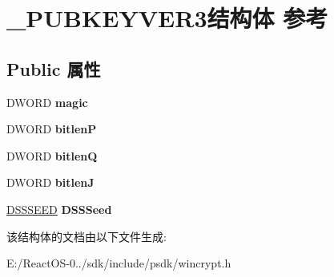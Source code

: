 \hypertarget{struct___p_u_b_k_e_y_v_e_r3}{}\section{\+\_\+\+P\+U\+B\+K\+E\+Y\+V\+E\+R3结构体 参考}
\label{struct___p_u_b_k_e_y_v_e_r3}
\subsection*{Public 属性}
\begin{DoxyCompactItemize}
\item 
\mbox{\label{struct___p_u_b_k_e_y_v_e_r3_a022508b267ba8cd9a052d7c02b828e4b}} 
D\+W\+O\+RD {\bfseries magic}
\item 
\mbox{\label{struct___p_u_b_k_e_y_v_e_r3_a458d6edf61f572ec201bdd6dfaaca802}} 
D\+W\+O\+RD {\bfseries bitlenP}
\item 
\mbox{\label{struct___p_u_b_k_e_y_v_e_r3_a5758fbc156e59ba981371ac3fd561bd1}} 
D\+W\+O\+RD {\bfseries bitlenQ}
\item 
\mbox{\label{struct___p_u_b_k_e_y_v_e_r3_a4c1f854b3a3ec508dd8892dcf8363046}} 
D\+W\+O\+RD {\bfseries bitlenJ}
\item 
\mbox{\label{struct___p_u_b_k_e_y_v_e_r3_aaf2de758357e39d694aaf92629157132}} 
\hyperlink{struct___d_s_s_s_e_e_d}{D\+S\+S\+S\+E\+ED} {\bfseries D\+S\+S\+Seed}
\end{DoxyCompactItemize}


该结构体的文档由以下文件生成\+:\begin{DoxyCompactItemize}
\item 
E\+:/\+React\+O\+S-\/0../sdk/include/psdk/wincrypt.\+h\end{DoxyCompactItemize}
